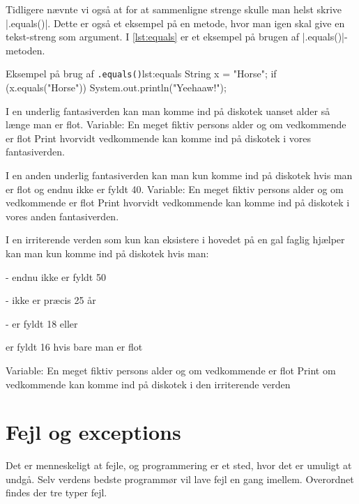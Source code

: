 {Tidligere nævnte vi også at for at sammenligne strenge skulle man helst skrive \JavaInline|.equals()|. Dette er også et eksempel på en metode, hvor man igen skal give en tekst-streng som argument. I \autoref{lst:equals} er et eksempel på brugen af \JavaInline|.equals()|-metoden.

\begin{JavaCode}{Eksempel på brug af \texttt{.equals()}}{lst:equals}
	String x = "Horse";
	if (x.equals("Horse")) {
		System.out.println("Yeehaaw!");
	}
\end{JavaCode}

\pagebreak

\begin{exercise}
	I en underlig fantasiverden kan man komme ind på diskotek uanset alder så længe man er flot.
	Variable: En meget fiktiv persons alder og om vedkommende er flot
	Print hvorvidt vedkommende kan komme ind på diskotek i vores fantasiverden.
\end{exercise}

\begin{exercise}
	I en anden underlig fantasiverden kan man kun komme ind på diskotek hvis man er flot og endnu ikke er fyldt 40.
	Variable: En meget fiktiv persons alder og om vedkommende er flot
	Print hvorvidt vedkommende kan komme ind på diskotek i vores anden fantasiverden.
\end{exercise}


\begin{exercise}
	I en irriterende verden som kun kan eksistere i hovedet på en gal faglig hjælper kan man kun komme ind på diskotek hvis man:
	
	- endnu ikke er fyldt 50
	
	- ikke er præcis 25 år
	
	- er fyldt 18
	eller
	
	er fyldt 16 hvis bare man er flot
	
	\noindent Variable: En meget fiktiv persons alder og om vedkommende er flot
	Print om vedkommende kan komme ind på diskotek i den irriterende verden
\end{exercise}

\section{Fejl og exceptions}
Det er menneskeligt at fejle, og programmering er et sted, hvor det er umuligt at undgå. Selv verdens bedste programmør vil lave fejl en gang imellem. Overordnet findes der tre typer fejl.

}
